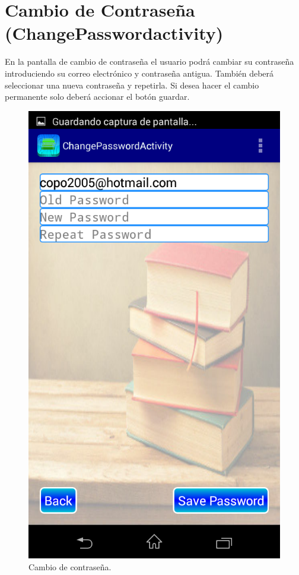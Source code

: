 	\section{Cambio de Contraseña (ChangePasswordactivity)} \label{sec:changePassword}
	
		En la pantalla de cambio de contraseña el usuario podrá cambiar su contraseña introduciendo su correo electrónico y contraseña antigua. También deberá seleccionar una nueva contraseña y repetirla. Si desea hacer el cambio permanente solo deberá accionar el botón guardar.
	
		\begin{figure}[h !]
			\centering
			\includegraphics[scale=0.2]{Imagenes/App/changePassword}
			\caption{Cambio de contraseña.}
			\label{fig:changePassword}
		\end{figure}
	
